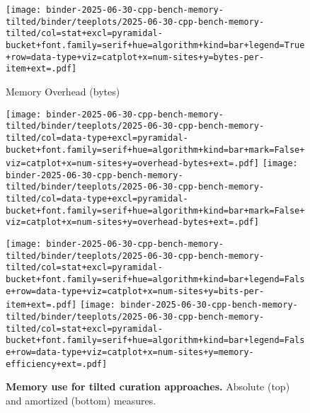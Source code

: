 \begin{figure}


\centering
\texttt{[image: binder-2025-06-30-cpp-bench-memory-tilted/binder/teeplots/2025-06-30-cpp-bench-memory-tilted/col=stat+excl=pyramidal-bucket+font.family=serif+hue=algorithm+kind=bar+legend=True+row=data-type+viz=catplot+x=num-sites+y=bytes-per-item+ext=.pdf]}

\vspace{1ex}

{\small Memory Overhead (bytes)\phantom{422}}

\vspace{1ex}

\hspace{-1ex}%
\texttt{[image: binder-2025-06-30-cpp-bench-memory-tilted/binder/teeplots/2025-06-30-cpp-bench-memory-tilted/col=data-type+excl=pyramidal-bucket+font.family=serif+hue=algorithm+kind=bar+mark=False+viz=catplot+x=num-sites+y=overhead-bytes+ext=.pdf]}%
\hspace{-0.5ex}%
\texttt{[image: binder-2025-06-30-cpp-bench-memory-tilted/binder/teeplots/2025-06-30-cpp-bench-memory-tilted/col=data-type+excl=pyramidal-bucket+font.family=serif+hue=algorithm+kind=bar+mark=False+viz=catplot+x=num-sites+y=overhead-bytes+ext=.pdf]}

\vspace{1.1ex}

\texttt{[image: binder-2025-06-30-cpp-bench-memory-tilted/binder/teeplots/2025-06-30-cpp-bench-memory-tilted/col=stat+excl=pyramidal-bucket+font.family=serif+hue=algorithm+kind=bar+legend=False+row=data-type+viz=catplot+x=num-sites+y=bits-per-item+ext=.pdf]}%
\texttt{[image: binder-2025-06-30-cpp-bench-memory-tilted/binder/teeplots/2025-06-30-cpp-bench-memory-tilted/col=stat+excl=pyramidal-bucket+font.family=serif+hue=algorithm+kind=bar+legend=False+row=data-type+viz=catplot+x=num-sites+y=memory-efficiency+ext=.pdf]}

\vspace{-2ex}

\caption{%
\textbf{Memory use for tilted curation approaches.}
\small
Absolute (top) and amortized (bottom) measures.
}
\label{fig:memory}
\end{figure}
